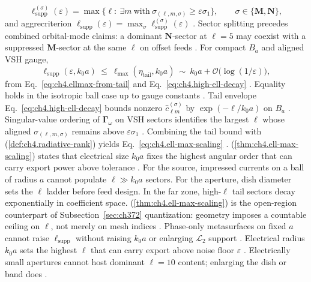 \begin{equation}
\label{eq:ch4.ell-sector-supported}
\ell_{\mathrm{supp}}^{(\sigma)}(\varepsilon)
=
\max\big\{\ell:\ \exists m\ \text{with}\ \sigma_{(\ell,m,\sigma)}\ge\varepsilon\sigma_{1}\big\},
\qquad
\sigma\in\{\mathbf{M},\mathbf{N}\},
\end{equation}
and aggrecriterion \(\ell_{\mathrm{supp}}(\varepsilon)=\max_{\sigma}\ell_{\mathrm{supp}}^{(\sigma)}(\varepsilon)\) \cite{hansen1988}.
Sector splitting precedes combined orbital-mode claims: a dominant \(\mathbf{N}\)-sector at \(\ell=5\) may coexist with a suppressed
\(\mathbf{M}\)-sector at the same \(\ell\) on offset feeds \cite{harrington2001}.
\label{thm:ch4.ell-max-scaling}
For compact \(B_{a}\) and aligned VSH gauge,
\begin{equation}
\label{eq:ch4.ell-max-scaling}
\ell_{\mathrm{supp}}(\varepsilon,k_{0}a)
\ \le\
\ell_{\max}(\eta_{\mathrm{tail}},k_{0}a)
\ \sim\
k_{0}a+\mathcal{O}\!\big(\log(1/\varepsilon)\big),
\end{equation}
from Eq.~\eqref{eq:ch4.ellmax-from-tail} and Eq.~\eqref{eq:ch4.high-ell-decay} \cite{hansen1988}.
Equality holds in the isotropic ball case up to gauge constants \cite{harrington2001}.
Tail envelope Eq.~\eqref{eq:ch4.high-ell-decay} bounds nonzero \(\widehat{c}_{\ell m}^{(\sigma)}\) by
\(\exp(-\ell/k_{0}a)\) on \(B_{a}\) \cite{hansen1988}. Singular-value ordering of \(\boldsymbol{\Gamma}_\omega\) on VSH
sectors identifies the largest \(\ell\) whose aligned \(\sigma_{(\ell,m,\sigma)}\) remains above \(\varepsilon\sigma_{1}\)
\cite{stratton1941}. Combining the tail bound with (\ref{def:ch4.radiative-rank}) yields
Eq.~\eqref{eq:ch4.ell-max-scaling} \cite{devaney2004}.
(\ref{thm:ch4.ell-max-scaling}) states that electrical size $k_{0}a$ fixes the highest angular order that can carry export power above tolerance \cite{jackson1999}. For the source, impressed currents on a ball of radius $a$ cannot populate $\ell\gg k_{0}a$ sectors. For the aperture, dish diameter sets the $\ell$ ladder before feed design. In the far zone, high-$\ell$ tail sectors decay exponentially in coefficient space. 
(\ref{thm:ch4.ell-max-scaling}) is the open-region counterpart of Subsection~\ref{sec:ch372} quantization: geometry imposes a
countable ceiling on \(\ell\), not merely on mesh indices \cite{stratton1941}. Phase-only metasurfaces on fixed \(a\) cannot raise
\(\ell_{\mathrm{supp}}\) without raising \(k_{0}a\) or enlarging \(\mathcal{L}_{2}\) support \cite{devaney2004}. 
Electrical radius $k_0 a$ sets the highest $\ell$ that can carry export above noise floor $\varepsilon$ \cite{jackson1999}. Electrically small apertures cannot host dominant $\ell=10$ content; enlarging the dish or band does \cite{harrington2001}.
